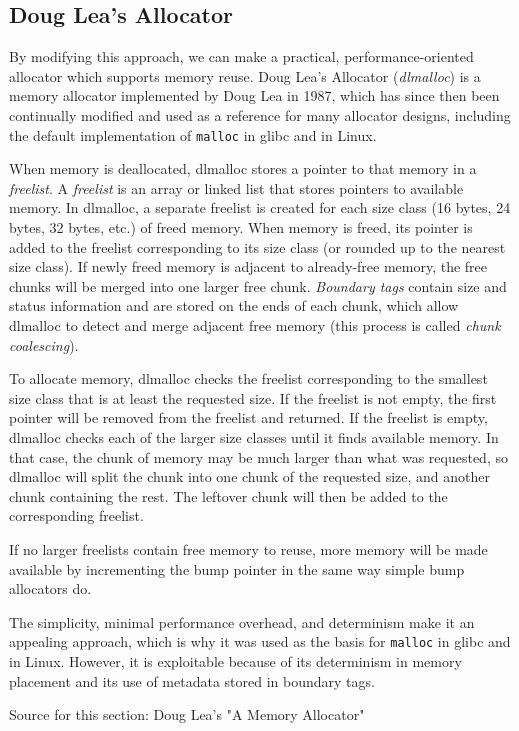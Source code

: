 \documentclass[conference]{IEEEtran}
\begin{document}
\subsection{Doug Lea's Allocator}
By modifying this approach, we can make a practical, performance-oriented allocator which supports memory reuse.
Doug Lea's Allocator (\emph{dlmalloc}) is a memory allocator implemented by Doug Lea in 1987, which has since then been continually modified and used as a reference for many allocator designs, including the default implementation of \verb|malloc| in glibc and in Linux.

When memory is deallocated, dlmalloc stores a pointer to that memory in a \emph{freelist}.
A \emph{freelist} is an array or linked list that stores pointers to available memory.
In dlmalloc, a separate freelist is created for each size class (16 bytes, 24 bytes, 32 bytes, etc.) of freed memory.
When memory is freed, its pointer is added to the freelist corresponding to its size class (or rounded up to the nearest size class).
If newly freed memory is adjacent to already-free memory, the free chunks will be merged into one larger free chunk.
\emph{Boundary tags} contain size and status information and are stored on the ends of each chunk, which allow dlmalloc to detect and merge adjacent free memory (this process is called \emph{chunk coalescing}).

To allocate memory, dlmalloc checks the freelist corresponding to the smallest size class that is at least the requested size.
If the freelist is not empty, the first pointer will be removed from the freelist and returned.
If the freelist is empty, dlmalloc checks each of the larger size classes until it finds available memory.
In that case, the chunk of memory may be much larger than what was requested, so dlmalloc will split the chunk into one chunk of the requested size, and another chunk containing the rest.
The leftover chunk will then be added to the corresponding freelist.

If no larger freelists contain free memory to reuse, more memory will be made available by incrementing the bump pointer in the same way simple bump allocators do.

The simplicity, minimal performance overhead, and determinism make it an appealing approach, which is why it was used as the basis for \verb|malloc| in glibc and in Linux.
However, it is exploitable because of its determinism in memory placement and its use of metadata stored in boundary tags.

	{\color{red} Source for this section: Doug Lea's "A Memory Allocator" }
\end{document}
